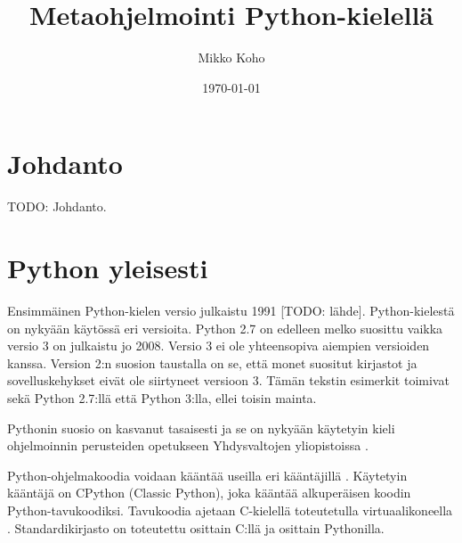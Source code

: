 \documentclass[finnish]{tktltiki2}
\title{Metaohjelmointi Python-kielellä}
\author{Mikko Koho}
\date{\today}
\theoremstyle{definition}
\theoremstyle{remark}
\begin{document}
    

\frontmatter      %

\maketitle        %

\makeabstract     %

\tableofcontents  %


\mainmatter       %


\section{Johdanto}

TODO: Johdanto.

\section{Python yleisesti}


Ensimmäinen Python-kielen versio julkaistu 1991 [TODO: lähde]. Python-kielestä on nykyään käytössä eri versioita. Python 2.7 on edelleen melko suosittu vaikka versio 3 on julkaistu jo 2008. Versio 3 ei ole yhteensopiva aiempien versioiden kanssa. Version 2:n suosion taustalla on se, että monet suositut kirjastot ja sovelluskehykset eivät ole siirtyneet versioon 3. Tämän tekstin esimerkit toimivat sekä Python 2.7:llä että Python 3:lla, ellei toisin mainta.

Pythonin suosio on kasvanut tasaisesti ja se on nykyään käytetyin kieli ohjelmoinnin perusteiden opetukseen Yhdysvaltojen yliopistoissa \cite{python-teaching}.

Python-ohjelmakoodia voidaan kääntää useilla eri kääntäjillä \cite{martelli2006python}. Käytetyin kääntäjä on CPython (Classic Python), joka kääntää alkuperäisen koodin Python-tavukoodiksi. Tavukoodia ajetaan C-kielellä toteutetulla virtuaalikoneella \cite{martelli2006python}. Standardikirjasto on toteutettu osittain C:llä ja osittain Pythonilla.
\end{document}
